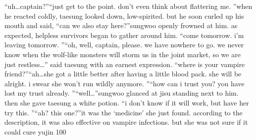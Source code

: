 “uh…captain?”“just get to the point.
 don’t even think about flattering me.
”when he reacted coldly, taesung looked down, low-spirited.
 but he soon curled up his mouth and said, “can we also stay here?”sungwoo openly frowned at him.
 as expected, helpless survivors began to gather around him.
“come tomorrow.
 i’m leaving tomorrow.
”“oh, well, captain, please.
 we have nowhere to go.
 we never know when the wolf-like monsters will storm us in the joint market, so we are just restless…” said taesung with an earnest expression.
“where is your vampire friend?”“ah…she got a little better after having a little blood pack.
 she will be alright.
 i swear she won’t run wildly anymore.
”“how can i trust you? you have lost my trust already.
”“well…”sungwoo glanced at jisu standing next to him.
 then she gave taesung a white potion.
“i don’t know if it will work, but have her try this.
”“ah? this one?”it was the ‘medicine’ she just found.
according to the description, it was also effective on vampire infections.
but she was not sure if it could cure yujin 100%


 